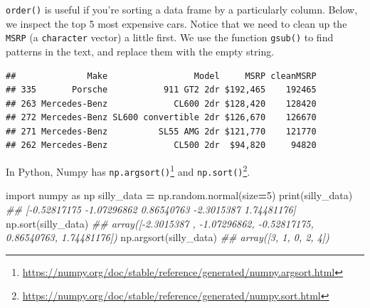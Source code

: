 \documentclass[
  12pt,
  krantz2]{krantz}
\makeatletter
\newenvironment{Shaded}{\begin{snugshade}}{\end{snugshade}}
\newcommand{\AttributeTok}[1]{\textcolor[rgb]{0.61,0.61,0.61}{#1}}
\newcommand{\BuiltInTok}[1]{#1}
\newcommand{\CommentTok}[1]{\textcolor[rgb]{0.37,0.37,0.37}{\textit{#1}}}
\newcommand{\ConstantTok}[1]{\textcolor[rgb]{0,0,0}{#1}}
\newcommand{\DecValTok}[1]{\textcolor[rgb]{0.06,0.06,0.06}{#1}}
\newcommand{\FunctionTok}[1]{\textcolor[rgb]{0,0,0}{#1}}
\newcommand{\ImportTok}[1]{#1}
\newcommand{\NormalTok}[1]{#1}
\newcommand{\OperatorTok}[1]{\textcolor[rgb]{0.43,0.43,0.43}{\textbf{#1}}}
\newcommand{\OtherTok}[1]{\textcolor[rgb]{0.37,0.37,0.37}{#1}}
\newcommand{\SpecialCharTok}[1]{\textcolor[rgb]{0,0,0}{#1}}
\newcommand{\StringTok}[1]{\textcolor[rgb]{0.5,0.5,0.5}{#1}}
\renewcommand{\href}[2]{#2\footnote{\url{#1}}}
\newenvironment{kframe}{%
\medskip{}
\setlength{\fboxsep}{.8em}
 \def\at@end@of@kframe{}%
 \ifinner\ifhmode%
  \def\at@end@of@kframe{\end{minipage}}%
  \begin{minipage}{\columnwidth}%
 \fi\fi%
 \def\FrameCommand##1{\hskip\@totalleftmargin \hskip-\fboxsep
 \colorbox{shadecolor}{##1}\hskip-\fboxsep
     \hskip-\linewidth \hskip-\@totalleftmargin \hskip\columnwidth}%
 \MakeFramed {\advance\hsize-\width
   \@totalleftmargin\z@ \linewidth\hsize
   \@setminipage}}%
 {\par\unskip\endMakeFramed%
 \at@end@of@kframe}
\renewenvironment{Shaded}{\begin{kframe}}{\end{kframe}}
\makeatother
\begin{document}
\texttt{order()} is useful if you're sorting a data frame by a particularly column. Below, we inspect the top 5 most expensive cars. Notice that we need to clean up the \texttt{MSRP} (a \texttt{character} vector) a little first. We use the function \texttt{gsub()} to find patterns in the text, and replace them with the empty string.

\begin{Shaded}
\end{Shaded}

\begin{verbatim}
##              Make                 Model     MSRP cleanMSRP
## 335       Porsche           911 GT2 2dr $192,465    192465
## 263 Mercedes-Benz             CL600 2dr $128,420    128420
## 272 Mercedes-Benz SL600 convertible 2dr $126,670    126670
## 271 Mercedes-Benz          SL55 AMG 2dr $121,770    121770
## 262 Mercedes-Benz             CL500 2dr  $94,820     94820
\end{verbatim}

In Python, Numpy has \href{https://numpy.org/doc/stable/reference/generated/numpy.argsort.html}{\texttt{np.argsort()}} and \href{https://numpy.org/doc/stable/reference/generated/numpy.sort.html}{\texttt{np.sort()}}.

\begin{Shaded}
\begin{Highlighting}[]
\ImportTok{import}\NormalTok{ numpy }\ImportTok{as}\NormalTok{ np}
\NormalTok{silly\_data }\OperatorTok{=}\NormalTok{ np.random.normal(size}\OperatorTok{=}\DecValTok{5}\NormalTok{)}
\BuiltInTok{print}\NormalTok{(silly\_data)}
\CommentTok{\#\# [{-}0.52817175 {-}1.07296862  0.86540763 {-}2.3015387   1.74481176]}
\NormalTok{np.sort(silly\_data)}
\CommentTok{\#\# array([{-}2.3015387 , {-}1.07296862, {-}0.52817175,  0.86540763,  1.74481176])}
\NormalTok{np.argsort(silly\_data)}
\CommentTok{\#\# array([3, 1, 0, 2, 4])}
\end{Highlighting}
\end{Shaded}
\end{document}

